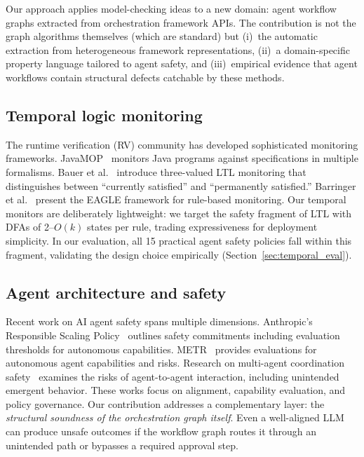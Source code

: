 

Our approach applies model-checking ideas to a new domain: agent
workflow graphs extracted from orchestration framework APIs. The
contribution is not the graph algorithms themselves (which are
standard) but (i)~the automatic extraction from heterogeneous
framework representations, (ii)~a domain-specific property language
tailored to agent safety, and (iii)~empirical evidence that agent
workflows contain structural defects catchable by these methods.

\subsection{Temporal logic monitoring}

The runtime verification (RV) community has developed sophisticated
monitoring frameworks.
JavaMOP~\citep{javamop} monitors Java programs against specifications
in multiple formalisms.
Bauer et al.~\citep{bauer2011ltl3} introduce three-valued LTL
monitoring that distinguishes between ``currently satisfied'' and
``permanently satisfied.''
Barringer et al.~\citep{barringer2004eagle} present the EAGLE framework
for rule-based monitoring.
Our temporal monitors are deliberately lightweight: we target the safety
fragment of LTL with DFAs of 2--$O(k)$ states per rule, trading
expressiveness for deployment simplicity. In our evaluation, all 15
practical agent safety policies fall within this fragment, validating the
design choice empirically (Section~\ref{sec:temporal_eval}).

\subsection{Agent architecture and safety}

Recent work on AI agent safety spans multiple dimensions.
Anthropic's Responsible Scaling Policy~\citep{anthropic_rsp} outlines
safety commitments including evaluation thresholds for autonomous
capabilities.
METR~\citep{metr} provides evaluations for autonomous agent
capabilities and risks.
Research on multi-agent coordination safety~\citep{gabriel2024ethics}
examines the risks of agent-to-agent interaction, including unintended
emergent behavior.
These works focus on alignment, capability evaluation, and policy
governance. Our contribution addresses a complementary layer: the
\emph{structural soundness of the orchestration graph itself}. Even a
well-aligned LLM can produce unsafe outcomes if the workflow graph
routes it through an unintended path or bypasses a required approval
step.

